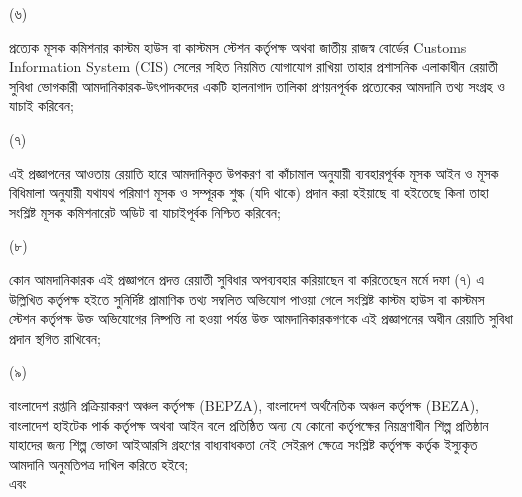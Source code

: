 \documentclass[12pt]{article}
\begin{document}
\begin{minipage}[t]{0.05\linewidth}
(৬)
\end{minipage}
\begin{minipage}[t]{0.9\linewidth}
প্রত্যেক মূসক কমিশনার কাস্টম হাউস বা
কাস্টমস স্টেশন কর্তৃপক্ষ অথবা জাতীয় রাজস্ব বোর্ডের
Customs Information System (CIS)
সেলের সহিত নিয়মিত যোগাযোগ রাখিয়া তাহার
প্রশাসনিক এলাকাধীন রেয়াতী সুবিধা ভোগকারী
আমদানিকারক-উৎপাদকদের একটি হালনাগাদ তালিকা
প্রণয়নপূর্বক প্রত্যেকের আমদানি তথ্য সংগ্রহ ও যাচাই
করিবেন;
\end{minipage}
\begin{minipage}[t]{0.05\linewidth}
\hspace{1em}
\end{minipage}
\begin{minipage}[t]{0.05\linewidth}
(৭)
\end{minipage}
\begin{minipage}[t]{0.9\linewidth}
এই প্রজ্ঞাপনের আওতায় রেয়াতি হারে আমদানিকৃত
উপকরণ বা কাঁচামাল অনুযায়ী ব্যবহারপূর্বক মূসক
আইন ও মূসক বিধিমালা অনুযায়ী
যথাযথ পরিমাণ মূসক ও সম্পূরক শুল্ক (যদি থাকে) প্রদান
করা হইয়াছে বা হইতেছে কিনা তাহা সংশ্লিষ্ট মূসক
কমিশনারেট অডিট বা যাচাইপূর্বক নিশ্চিত করিবেন;
\\
\end{minipage}
\begin{minipage}[t]{0.05\linewidth}
\hspace{1em}
\end{minipage}
\begin{minipage}[t]{0.05\linewidth}
(৮)
\end{minipage}
\begin{minipage}[t]{0.9\linewidth}
কোন আমদানিকারক এই প্রজ্ঞাপনে প্রদত্ত রেয়াতী
সুবিধার অপব্যবহার করিয়াছেন বা করিতেছেন
মর্মে দফা (৭) এ উল্লিখিত কর্তৃপক্ষ হইতে সুনির্দিষ্ট
প্রামাণিক তথ্য সম্বলিত অভিযোগ পাওয়া গেলে সংশ্লিষ্ট
কাস্টম হাউস বা কাস্টমস স্টেশন কর্তৃপক্ষ উক্ত অভিযোগের
নিষ্পত্তি না হওয়া পর্যন্ত উক্ত আমদানিকারকগণকে
এই প্রজ্ঞাপনের অধীন রেয়াতি সুবিধা প্রদান স্থগিত রাখিবেন;
\\
\end{minipage}
\begin{minipage}[t]{0.05\linewidth}
\hspace{1em}
\end{minipage}
\begin{minipage}[t]{0.05\linewidth}
(৯)
\end{minipage}
\begin{minipage}[t]{0.9\linewidth}
বাংলাদেশ রপ্তানি প্রক্রিয়াকরণ অঞ্চল কর্তৃপক্ষ (BEPZA),
বাংলাদেশ অর্থনৈতিক অঞ্চল কর্তৃপক্ষ (BEZA),
বাংলাদেশ হাইটেক পার্ক কর্তৃপক্ষ অথবা আইন বলে প্রতিষ্ঠিত
অন্য যে কোনো কর্তৃপক্ষের নিয়ন্ত্রণাধীন শিল্প প্রতিষ্ঠান যাহাদের জন্য শিল্প ভোক্তা আইআরসি গ্রহণের বাধ্যবাধকতা নেই সেইরূপ
ক্ষেত্রে সংশ্লিষ্ট কর্তৃপক্ষ কর্তৃক ইস্যুকৃত আমদানি অনুমতিপত্র
দাখিল করিতে হইবে;
\\
এবং
\\
\end{minipage}
\end{document}
